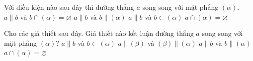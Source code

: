 \begin{ex}%
	Với điều kiện nào sau đây thì đường thẳng $a$  song song với mặt phẳng $(\alpha)$.
	\choice 
		{$a\parallel b$ và $b\cap  (\alpha)=\varnothing$}
		{$a\parallel b$  và $b\parallel (\alpha)$}
		 {\True $a\parallel b$ và $b\subset (\alpha)$}
		{$a\cap  (\alpha)=\varnothing$}
\end{ex}

\begin{ex}%
	Cho các giả thiết sau đây. Giả thiết nào kết luận đường thẳng $a$  song song với mặt phẳng $\left(\alpha \right)$?
	\choice 
		{$a\parallel b$ và $b\subset \left(\alpha  \right)$}
		{$a\parallel  \left(\beta \right)$ và $\left(\beta \right)\parallel \left(\alpha \right)$}
		{$a\parallel b$ và  $b\parallel \left(\alpha \right)$}
		{\True $a\cap \left(\alpha  \right)=\varnothing$}
\end{ex}

